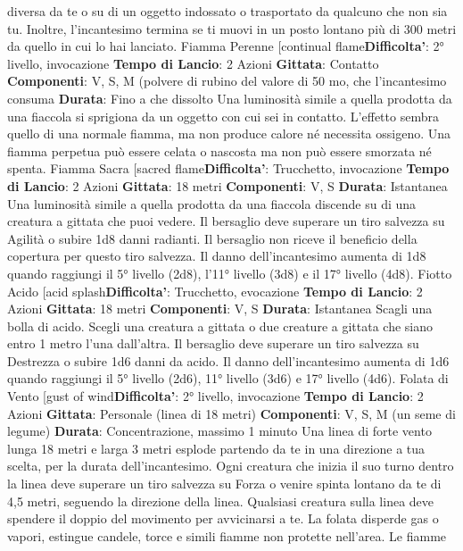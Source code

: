 \begin{multicols}{2}
diversa da te o su di un oggetto indossato o trasportato
da qualcuno che non sia tu. Inoltre, l’incantesimo
termina se ti muovi in un posto lontano più di 300 metri
da quello in cui lo hai lanciato.
Fiamma Perenne
[continual flame\textbf{Difficolta'}:
2° livello, invocazione
\textbf{Tempo di Lancio}: 2 Azioni
\textbf{Gittata}: Contatto
\textbf{Componenti}: V, S, M (polvere di rubino del valore di 50
mo, che l’incantesimo consuma
\textbf{Durata}: Fino a che dissolto
Una luminosità simile a quella prodotta da una fiaccola
si sprigiona da un oggetto con cui sei in contatto.
L’effetto sembra quello di una normale fiamma, ma non
produce calore né necessita ossigeno. Una fiamma
perpetua può essere celata o nascosta ma non può
essere smorzata né spenta.
Fiamma Sacra
[sacred flame\textbf{Difficolta'}:
Trucchetto, invocazione
\textbf{Tempo di Lancio}: 2 Azioni
\textbf{Gittata}: 18 metri
\textbf{Componenti}: V, S
\textbf{Durata}: Istantanea
Una luminosità simile a quella prodotta da una fiaccola
discende su di una creatura a gittata che puoi vedere. Il
bersaglio deve superare un tiro salvezza su Agilità
o subire 1d8 danni radianti. Il bersaglio non riceve il
beneficio della copertura per questo tiro salvezza.
Il danno dell’incantesimo aumenta di 1d8 quando
raggiungi il 5° livello (2d8), l’11° livello (3d8) e il 17°
livello (4d8).
Fiotto Acido
[acid splash\textbf{Difficolta'}:
Trucchetto, evocazione
\textbf{Tempo di Lancio}: 2 Azioni
\textbf{Gittata}: 18 metri
\textbf{Componenti}: V, S
\textbf{Durata}: Istantanea
Scagli una bolla di acido. Scegli una creatura a gittata o
due creature a gittata che siano entro 1 metro l’una
dall’altra. Il bersaglio deve superare un tiro salvezza su
Destrezza o subire 1d6 danni da acido.
Il danno dell’incantesimo aumenta di 1d6 quando
raggiungi il 5° livello (2d6), 11° livello (3d6) e 17° livello
(4d6).
Folata di Vento
[gust of wind\textbf{Difficolta'}:
2° livello, invocazione
\textbf{Tempo di Lancio}: 2 Azioni
\textbf{Gittata}: Personale (linea di 18 metri)
\textbf{Componenti}: V, S, M (un seme di legume)
\textbf{Durata}: Concentrazione, massimo 1 minuto
Una linea di forte vento lunga 18 metri e larga 3 metri
esplode partendo da te in una direzione a tua scelta,
per la durata dell’incantesimo. Ogni creatura che inizia il
suo turno dentro la linea deve superare un tiro salvezza
su Forza o venire spinta lontano da te di 4,5 metri,
seguendo la direzione della linea.
Qualsiasi creatura sulla linea deve spendere il doppio
del movimento per avvicinarsi a te.
La folata disperde gas o vapori, estingue candele, torce
e simili fiamme non protette nell’area. Le fiamme

\end{multicols}

